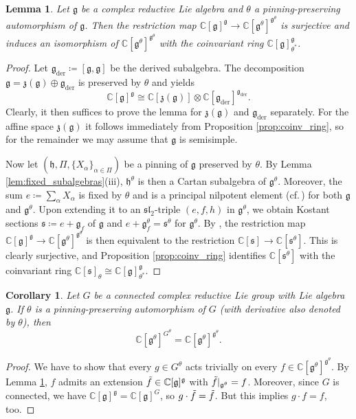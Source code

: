 \documentclass{amsart}
\newcommand{\cf}{cf.\,}
\newcommand{\C}{\mathbb{C}}
\newcommand{\g}{\mathfrak{g}}
\newcommand{\h}{\mathfrak{h}}
\newcommand{\s}{\mathfrak{s}}
\renewcommand{\sl}{\mathfrak{sl}}
\newcommand{\z}{\mathfrak{z}}
\theoremstyle{definition}
\theoremstyle{plain}
\newtheorem{lem}[defn]{Lemma}
\newtheorem{cor}[defn]{Corollary}
\theoremstyle{remark}
\begin{document}
\begin{lem}
\label{lem:dist_coinv}
    Let $\g$ be a complex reductive Lie algebra and $\theta$ a pinning-preserving automorphism of $\g$. Then the restriction map
    $
        \C[\g]^\g \to \C[\g^\theta]^{\g^\theta}
    $
    is surjective and induces an isomorphism of $\C[\g^\theta]^{\g^\theta}$ with the coinvariant ring $\C[\g]^\g_{\theta^*}$. 
\end{lem}
\begin{proof}
Let $\g_{\text{der}}\coloneqq [\g,\g]$ be the derived subalgebra. The decomposition $\g = \z(\g) \oplus \g_{\text{der}}$ is preserved by $\theta$ and yields
$$
    \C[\g]^\g \cong \C[\z(\g)]\otimes \C[\g_{\text{der}}]^{\g_{\text{der}}}.
$$
Clearly, it then suffices to prove the lemma for $\z(\g)$ and $\g_{\text{der}}$ separately. For the affine space $\z(\g)$ it follows immediately from Proposition \ref{prop:coinv_ring}, so for the remainder we may assume that $\g$ is semisimple.

Now let $(\h, \Pi, \{X_\alpha\}_{\alpha\in \Pi})$ be a pinning of $\g$ preserved by $\theta$. By Lemma \ref{lem:fixed_subalgebras}(iii), $\h^\theta$ is then a Cartan subalgebra of $\g^\theta$. Moreover, the sum $e\coloneqq \sum_{\alpha} X_\alpha$ is fixed by $\theta$ and is a principal nilpotent element (\cf \cite[\S5]{Kostant1959_TDS}) for both $\g$ and $\g^\theta$. Upon extending it to an $\sl_2$-triple $(e,f,h)$ in $\g^\theta$, we obtain Kostant sections $\s\coloneqq e+ \g_f$ of $\g$ and $e+\g^\theta_f = \s^\theta$ for $\g^\theta$. By \cite[Thm.\,7]{Kostant1963_LGRoPR}, the restriction map $\C[\g]^\g\to \C[\g^\theta]^{\g^\theta}$ is then equivalent to the restriction $\C[\s]\to \C[\s^\theta]$. This is clearly surjective, and Proposition \ref{prop:coinv_ring} identifies $\C[\s^\theta]$ with the coinvariant ring $\C[\s]_\theta \cong \C[\g]^\g_{\theta^*}$.
\end{proof}
\begin{cor}
\label{cor:disconn_inv_ring_nice}
    Let $G$ be a connected complex reductive Lie group with Lie algebra $\g$. If $\theta$ is a pinning-preserving automorphism of $G$ (with derivative also denoted by $\theta$), then
    $$
        \C[\g^\theta]^{G^\theta} = \C[\g^\theta]^{\g^\theta}.
    $$
\end{cor}
\begin{proof}
    We have to show that every $g\in G^\theta$ acts trivially on every $f\in \C[\g^\theta]^{\g^\theta}$. By Lemma \ref{lem:dist_coinv}, $f$ admits an extension $\Tilde{f}\in \C[\g]^\g$ with $\Tilde{f}|_{\g^\theta} = f$. Moreover, since $G$ is connected, we have $\C[\g]^\g = \C[\g]^G$, so $g\cdot \Tilde{f} = \Tilde{f}$. But this implies $g\cdot f  = f$, too.
\end{proof}
\end{document}
